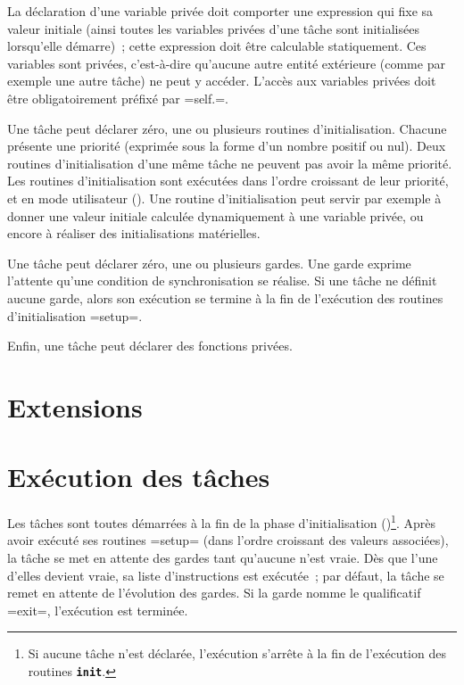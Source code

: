 La déclaration d'une variable privée doit comporter une expression qui fixe sa valeur initiale (ainsi toutes les variables privées d'une tâche sont initialisées lorsqu'elle démarre)~; cette expression doit être calculable statiquement. Ces variables sont privées, c'est-à-dire qu'aucune autre entité extérieure (comme par exemple une autre tâche) ne peut y accéder. L'accès aux variables privées doit être obligatoirement préfixé par \plm=self.=.

Une tâche peut déclarer zéro, une ou plusieurs routines d'initialisation. Chacune présente une priorité (exprimée sous la forme d'un nombre positif ou nul). Deux routines d'initialisation d'une même tâche ne peuvent pas avoir la même priorité. Les routines d'initialisation sont exécutées dans l'ordre croissant de leur priorité, et en mode utilisateur (). Une routine d'initialisation peut servir par exemple à donner une valeur initiale calculée dynamiquement à une variable privée, ou encore à réaliser des initialisations matérielles.

Une tâche peut déclarer zéro, une ou plusieurs gardes. Une garde exprime l'attente qu'une condition de synchronisation se réalise. Si une tâche ne définit aucune garde, alors son exécution se termine à la fin de l'exécution des routines d'initialisation \plm=setup=.

Enfin, une tâche peut déclarer des fonctions privées.






\section{Extensions}






\section{Exécution des tâches}

Les tâches sont toutes démarrées à la fin de la phase d'initialisation ()\footnote{Si aucune tâche n'est déclarée, l'exécution s'arrête à la fin de l'exécution des routines \texttt{\bf init}.}. Après avoir exécuté ses routines \plm=setup= (dans l'ordre croissant des valeurs associées), la tâche se met en attente des gardes tant qu'aucune n'est vraie. Dès que l'une d'elles devient vraie, sa liste d'instructions est exécutée~; par défaut, la tâche se remet en attente de l'évolution des gardes. Si la garde nomme le qualificatif \plm=exit=, l'exécution est terminée.

